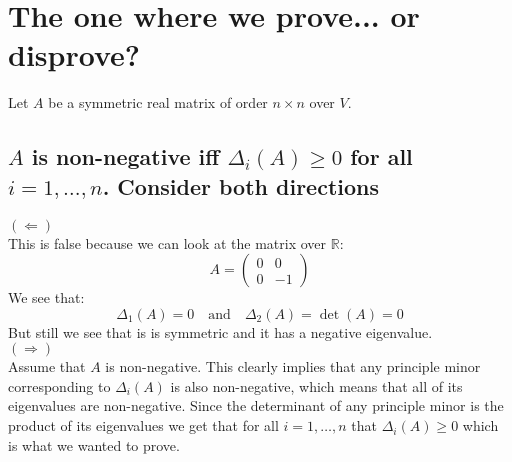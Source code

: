 \documentclass[11pt,a4paper]{article}
\theoremstyle{plain}
\newcommand{\R}{\mathbb{R}}
\begin{document}
	\newpage
	
	\section{The one where we prove... or disprove?}
	Let $A$ be a symmetric real matrix of order $n\times n$ over $V$.
	\subsection{$A$ is non-negative iff $\Delta_i(A) \geq 0$ for all 
	$i = 1,\dots,n$. Consider both directions}
	\underline{$(\Leftarrow)$} \\
	This is false because we can look at the matrix over $\R$:
	\[
	A = 
		\begin{pmatrix}
			0 & 0 \\
			0 & -1
		\end{pmatrix}
	\]
	We see that:
	\[
		\Delta_1(A) = 0 \quad\text{and}\quad \Delta_2(A) = \det(A) = 0
	\]
	But still we see that is is symmetric and it has a negative eigenvalue.
	\\
	\underline{$(\Rightarrow)$} \\
	Assume that $A$ is non-negative. This clearly implies that any principle 
	minor corresponding to $\Delta_i(A)$ is also non-negative, which means that
	all of its eigenvalues are non-negative. Since the determinant of any
	principle minor is the product of its eigenvalues we get that for all
	$i = 1,\dots,n$ that $\Delta_i(A) \geq 0$ which is what we wanted to prove.
	
	\newpage
	
	\iffalse
	\section{The one with the extra difficulty}
	\subsection{Let $f$, $g$ be inner products on $V$ a finite-dimension vector 
	space. Prove that exists a basis that is orthonormal by $f$ and orthogonal 
	by $g$.}
	\fi
	
	\newpage
	
\end{document}
